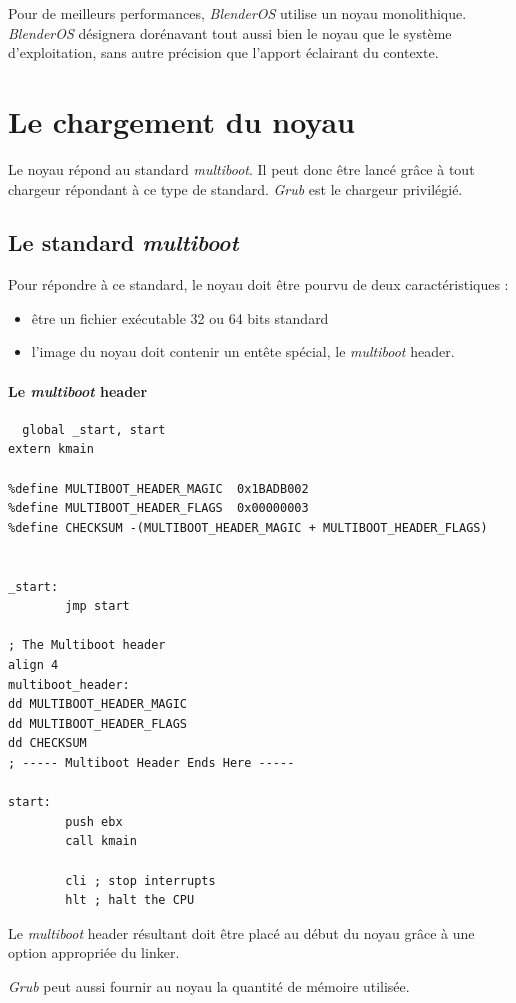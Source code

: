 \documentclass{article}
\begin{document}
  Pour de meilleurs performances, \emph{BlenderOS} utilise un noyau monolithique. \emph{BlenderOS} désignera dorénavant tout aussi bien le noyau que le système d'exploitation, sans autre précision que l'apport éclairant du contexte.

\section{Le chargement du noyau}
  Le noyau répond au standard \emph{multiboot}. Il peut donc être lancé grâce à tout chargeur répondant à ce type de standard. \emph{Grub} est le chargeur privilégié.
 
\subsection{Le standard \emph{multiboot} }
  Pour répondre à ce standard, le noyau doit être pourvu de deux caractéristiques :
  \begin{itemize}
  	\item être un fichier exécutable 32 ou 64 bits standard
  	\item l'image du noyau doit contenir un entête spécial, le \emph{multiboot} header.
  \end{itemize}
  \paragraph*{Le \emph{multiboot} header}
  \begin{verbatim}
  global _start, start
extern kmain
   
%define MULTIBOOT_HEADER_MAGIC  0x1BADB002
%define MULTIBOOT_HEADER_FLAGS  0x00000003
%define CHECKSUM -(MULTIBOOT_HEADER_MAGIC + MULTIBOOT_HEADER_FLAGS)


_start:
        jmp start

; The Multiboot header
align 4
multiboot_header:
dd MULTIBOOT_HEADER_MAGIC
dd MULTIBOOT_HEADER_FLAGS
dd CHECKSUM    
; ----- Multiboot Header Ends Here -----

start:
        push ebx
        call kmain

        cli ; stop interrupts
        hlt ; halt the CPU
  \end{verbatim}

  Le \emph{multiboot} header résultant doit être placé au début du noyau grâce à une option appropriée du linker.
  
 \emph{Grub} peut aussi fournir au noyau la quantité de mémoire utilisée.
 
\end{document}
